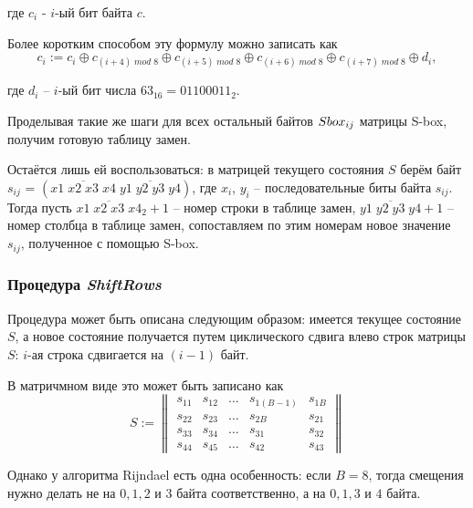     где $c_{i}$ - $i$-ый бит байта $c$.

    Более коротким способом эту формулу можно записать как
    \begin{equation}
        c_{i} := c_{i} \oplus c_{(i + 4) \; mod \; 8} \oplus c_{(i + 5) \; mod \; 8} \oplus c_{(i + 6) \; mod \; 8}
        \oplus c_{(i + 7) \; mod \; 8} \oplus d_{i},
    \end{equation}

    где $d_{i}$ -- $i$-ый бит числа $63_{16} = 01100011_{2}$.

    Проделывая такие же шаги для всех остальный байтов $S\-box_{ij}$ матрицы S-box, получим готовую таблицу замен.

    Остаётся лишь ей воспользоваться: в матрицей текущего состояния $S$ берём байт
    $s_{ij}$ = $(\overline{x1 \; x2 \; x3 \; x4} \; \overline{y1 \; y2 \; y3 \; y4})$, где $x_{i}$, $y_{i}$ -- последовательные
    биты байта $s_{ij}$. Тогда пусть $\overline{x1 \; x2 \; x3 \; x4}_2 + 1$ -- номер строки в таблице замен,
    $\overline{y1 \; y2 \; y3 \; y4} + 1$ -- номер столбца в таблице замен, сопоставляем по этим номерам новое значение
    $s_{ij}$, полученное с помощью S-box.

\subsubsection{Процедура \textit{ShiftRows}} \label{ShiftRows}

    Процедура может быть описана следующим образом: имеется текущее состояние $S$, а новое состояние
    получается путем циклического сдвига влево строк матрицы $S$: $i$-ая строка сдвигается на $(i - 1)$
    байт.

    В матричмном виде это может быть записано как
    \begin{equation}
        S :=
        \begin{Vmatrix}
            s_{11} & s_{12} & \dots & s_{1(B - 1)} & s_{1B} \\
            s_{22} & s_{23} & \dots & s_{2B} & s_{21} \\
            s_{33} & s_{34} & \dots & s_{31} & s_{32} \\
            s_{44} & s_{45} & \dots & s_{42} & s_{43}
        \end{Vmatrix}
    \end{equation}

    Однако у алгоритма Rijndael есть одна особенность: если $B = 8$, тогда смещения нужно делать не на
    $0, 1, 2$ и $3$ байта соответственно, а на $0, 1, 3$ и $4$ байта.

